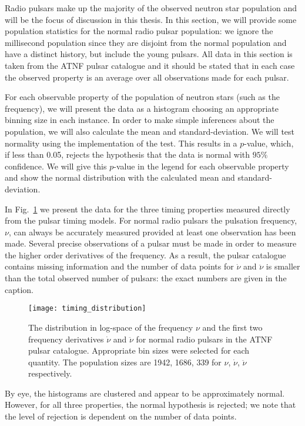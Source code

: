 Radio pulsars make up the majority of the observed neutron star population and will be
the focus of discussion in this thesis. In this section, we will provide some
population statistics for the normal radio pulsar population: we ignore the
millisecond population since they are disjoint from the normal population and
have a distinct history, but include the young pulsars. All data
in this section is taken from the ATNF pulsar catalogue \citet{ATNF} and it
should be stated that in each case the observed property is an average
over all observations made for each pulsar.

For each observable property of the population of neutron stars (such as the
frequency), we will present the data as a histogram choosing an appropriate
binning size in each instance. In order to make simple inferences about the
population, we will also calculate the mean and standard-deviation.
We will test normality using the \citet{Scipy} implementation of the
\citet{d1971omnibus} test. This results in a $p$-value, which, if less than
0.05, rejects the hypothesis that the data is normal with $95\%$ confidence. We
will give this $p$-value in the legend for each observable property and show
the normal distribution with the calculated mean and standard-deviation.


In Fig.~\ref{fig: pop stats timing} we present the data for the three timing
properties measured directly from the pulsar timing models. For normal radio
pulsars the pulsation frequency, $\nu$, can always be accurately measured
provided at least
one observation has been made.  Several precise observations of a pulsar must
be made in order to measure the higher order derivatives of the frequency. As a
result, the pulsar catalogue contains missing information and the number of
data points for $\dot{\nu}$ and $\ddot{\nu}$ is smaller than the total observed
number of pulsars: the exact numbers are given in the caption.
\begin{figure}[htb]
\centering
\texttt{[image: timing\_distribution]}
\caption{The distribution in log-space of the frequency $\nu$ and the first two
frequency derivatives $\dot{\nu}$ and $\ddot{\nu}$ for normal radio pulsars in the
ATNF pulsar catalogue. Appropriate bin sizes were selected for each quantity.
The population sizes are 1942, 1686, 339 for $\nu$,
$\dot{\nu}$, $\ddot{\nu}$ respectively.}
\label{fig: pop stats timing}
\end{figure}
By eye, the histograms are clustered and appear to be approximately normal.
However, for all three properties, the normal hypothesis is rejected; we note
that the level of rejection is dependent on the number of data points.

